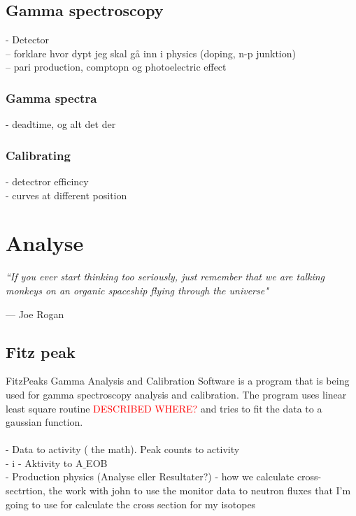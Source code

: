 \documentclass[twoside,english]{uiofysmaster/uiofysmaster}
\begin{document}
\section{Gamma spectroscopy}
\label{sec: gamma_spectro}

- Detector\\
-- forklare hvor dypt jeg skal gå inn i physics (doping, n-p junktion)\\
-- pari production, comptopn og photoelectric effect


\subsection{Gamma spectra}
\label{sec: gamma_spectra}

- deadtime, og alt det der

\subsection{Calibrating}
\label{sec: calibrating}

- detectror efficincy\\
- curves at different position


\chapter{Analyse}
\label{ch:analyse}

\epigraph{\itshape ``If you ever start thinking too seriously, just remember that we are talking monkeys on an organic spaceship flying through the universe"}{--- \textup{Joe Rogan}}



\section{Fitz peak}
\label{sec:fitz_peak}

FitzPeaks Gamma Analysis and Calibration Software is a program that  is being used for gamma spectroscopy analysis and calibration. The program uses linear least square routine \textcolor{red}{DESCRIBED WHERE?} and tries to fit the data to a gaussian function. 
\\
 \\
- Data to activity ( the math). Peak counts to activity\\
- i - Aktivity to A$\_$EOB\\
- Production physics (Analyse eller Resultater?) - how we calculate cross-sectrtion, the work with john to use the monitor data to neutron fluxes that I’m going to use for calculate the cross section for my isotopes
\end{document}
